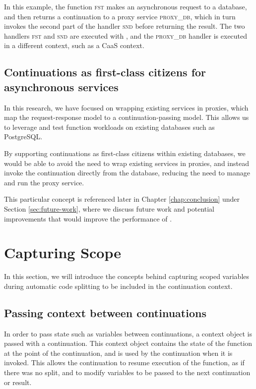 In this example, the function \textsc{fst} makes an asynchronous request to a database, and then returns a continuation to a proxy service \textsc{proxy_db}, which in turn invokes the second part of the handler \textsc{snd} before returning the result. The two handlers \textsc{fst} and \textsc{snd} are executed with \faas{}, and the \textsc{proxy_db} handler is executed in a different context, such as a CaaS context.

\subsection{Continuations as first-class citizens for asynchronous services}
In this research, we have focused on wrapping existing services in proxies, which map the request-response model to a continuation-passing model. This allows us to leverage and test function workloads on existing databases such as PostgreSQL.

By supporting continuations as first-class citizens within existing databases, we would be able to avoid the need to wrap existing services in proxies, and instead invoke the continuation directly from the database, reducing the need to manage and run the proxy service.

This particular concept is referenced later in Chapter \ref{chap:conclusion} under Section \ref{sec:future-work}, where we discuss future work and potential improvements that would improve the performance of \faaas{}.

\section{Capturing Scope}
In this section, we will introduce the concepts behind capturing scoped variables during automatic code splitting to be included in the continuation context.

\subsection{Passing context between continuations}
In order to pass state such as variables between continuations, a context object is passed with a continuation. This context object contains the state of the function at the point of the continuation, and is used by the continuation when it is invoked. This allows the continuation to resume execution of the function, as if there was no split, and to modify variables to be passed to the next continuation or result.

